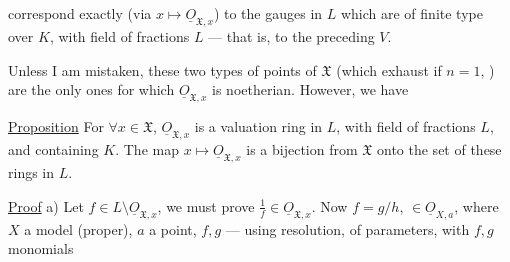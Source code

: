 correspond exactly (via $x\longmapsto\underline{O}_{\mathfrak X,x}$) to the gauges in $L$ which are  of finite type over $K$, with field of fractions $L$ --- that is, to the preceding $V$.

Unless I am mistaken, these two types of points of $\mathfrak X$ (which exhaust  if $n=1$, ) are the only ones for which $\underline{O}_{\mathfrak X,x}$ is noetherian. However, we have

\margin{$\big|$}
\uline{Proposition} For $\forall x\in\mathfrak X$, $\underline{O}_{\mathfrak X,x}$ is a valuation ring in $L$, with field of fractions $L$, and containing $K$. The map $x\longmapsto\underline{O}_{\mathfrak X,x}$ is a bijection from $\mathfrak X$ onto the set of these rings in $L$.

\uline{Proof} a) Let $f\in L\setminus\underline{O}_{\mathfrak X,x}$, we must prove $\frac1f\in\underline{O}_{\mathfrak X,x}$. Now $f=g/h$, $\in\underline{O}_{X,a}$, where $X$ a  model (proper), $a$ a point, $f,g$  --- using resolution,   of parameters, with $f,g$ monomials

